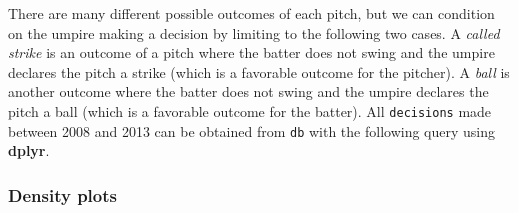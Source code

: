 \documentclass[12pt,]{isuthesis}
\newenvironment{Shaded}{\begin{snugshade}}{\end{snugshade}}
\newcommand{\KeywordTok}[1]{\textcolor[rgb]{0.13,0.29,0.53}{\textbf{{#1}}}}
\newcommand{\DataTypeTok}[1]{\textcolor[rgb]{0.13,0.29,0.53}{{#1}}}
\newcommand{\StringTok}[1]{\textcolor[rgb]{0.31,0.60,0.02}{{#1}}}
\newcommand{\CommentTok}[1]{\textcolor[rgb]{0.56,0.35,0.01}{\textit{{#1}}}}
\newcommand{\NormalTok}[1]{{#1}}
\begin{document}
There are many different possible outcomes of each pitch, but we can
condition on the umpire making a decision by limiting to the following
two cases. A \textit{called strike} is an outcome of a pitch where the
batter does not swing and the umpire declares the pitch a strike (which
is a favorable outcome for the pitcher). A \textit{ball} is another
outcome where the batter does not swing and the umpire declares the
pitch a ball (which is a favorable outcome for the batter). All
\texttt{decisions} made between 2008 and 2013 can be obtained from
\texttt{db} with the following query using \textbf{dplyr}.

\begin{Shaded}
\end{Shaded}

\subsubsection{Density plots}
\end{document}
